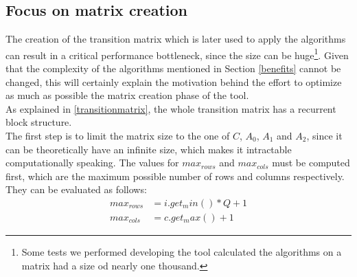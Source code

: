 \subsection{Focus on matrix creation}
The creation of the transition matrix which is later used to apply the algorithms can result in a critical performance bottleneck, since the size can be huge\footnote{Some tests we performed developing the tool calculated the algorithms on a matrix had a size od nearly one thousand.}. Given that the complexity of the algorithms mentioned in Section \ref{benefits} cannot be changed, this will certainly explain the motivation behind the effort to optimize as much as possible the matrix creation phase of the tool.\\
As explained in \ref{transitionmatrix}, the whole transition matrix has a recurrent block structure.\\ 
The first step is to limit the matrix size to the one of \( C \), \( A_{0} \), \( A_{1} \) and \( A_{2} \), since it can be theoretically have an infinite size, which makes it intractable computationally speaking. The values for \( max_{rows} \) and \( max_{cols} \) must be computed first, which are the maximum possible number of rows and columns respectively.\\ 
They can be evaluated as follows: 
\begin{equation*}
\begin{split}
  max_{rows} &= i.get_min() * Q + 1 \\
  max_{cols} &= c.get_max() + 1
\end{split}
\end{equation*}

